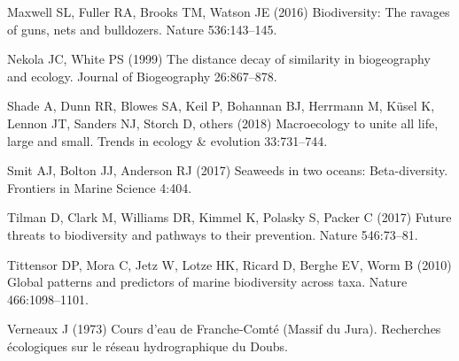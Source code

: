 \documentclass[
  10pt,
]{book}
\newlength{\cslhangindent}
\newenvironment{CSLReferences}[2] %
 {\begin{list}{}{%
  \setlength{\itemindent}{0pt}
  \setlength{\leftmargin}{0pt}
  \setlength{\parsep}{0pt}
  \ifodd #1
   \setlength{\leftmargin}{\cslhangindent}
   \setlength{\itemindent}{-1\cslhangindent}
  \fi
  \setlength{\itemsep}{#2\baselineskip}}}
 {\end{list}}
\begin{document}
\begin{CSLReferences}{1}{1}
Maxwell SL, Fuller RA, Brooks TM, Watson JE (2016) Biodiversity: The
ravages of guns, nets and bulldozers. Nature 536:143--145.

Nekola JC, White PS (1999) The distance decay of similarity in
biogeography and ecology. {Journal of Biogeography} 26:867--878.

Shade A, Dunn RR, Blowes SA, Keil P, Bohannan BJ, Herrmann M, Küsel K,
Lennon JT, Sanders NJ, Storch D, others (2018) Macroecology to unite all
life, large and small. Trends in ecology \& evolution 33:731--744.

Smit AJ, Bolton JJ, Anderson RJ (2017) Seaweeds in two oceans:
Beta-diversity. {Frontiers in Marine Science} 4:404.

Tilman D, Clark M, Williams DR, Kimmel K, Polasky S, Packer C (2017)
Future threats to biodiversity and pathways to their prevention. Nature
546:73--81.

Tittensor DP, Mora C, Jetz W, Lotze HK, Ricard D, Berghe EV, Worm B
(2010) Global patterns and predictors of marine biodiversity across
taxa. Nature 466:1098--1101.

Verneaux J (1973) Cours d'eau de {F}ranche-{C}omt{é} ({M}assif du
{J}ura). Recherches {é}cologiques sur le r{é}seau hydrographique du
{D}oubs.

\end{CSLReferences}


\backmatter
\end{document}

